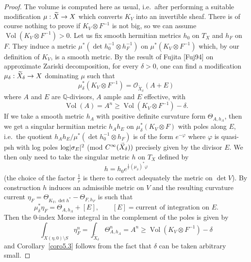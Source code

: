\documentclass[10pt,a4paper]{article}
\DeclareMathOperator{\Vol}{Vol}
\DeclarePairedDelimiter{\abs}{\lvert}{\rvert}
\newcommand*\cO{\mathcal{O}}
\newcommand*\bQ{\mathbb{Q}}
\let\geq\geqslant
\numberwithin{equation}{section}
\begin{document}
\begin{proof}
The volume is computed here as usual, i.e.\ after performing a suitable modifi\-cation $\mu:\smash{\widetilde X}\to X$ which converts $K_V$ into an invertible sheaf. There is of course nothing to prove if
$K_V\otimes F^{-1}$ is not big, so we can assume $\Vol(K_V\otimes F^{-1})>0$. Let us fix smooth hermitian metrics $h_0$ on $T_X$ and
$h_F$ on $F$. They induce a metric $\mu^*(\det h_0^{-1}\otimes h_F^{-1})$ on $\mu^*(K_V\otimes F^{-1})$ which, by our definition of $K_V$, is a smooth metric. By the result of Fujita [Fuj94] on approximate Zariski decomposition, for every $\delta>0$, one can find a modification $\mu_\delta:\smash{\widetilde X_\delta}\to X$ dominating
$\mu$ such that
\[
\mu_\delta^*\left(K_V\otimes F^{-1}\right) =\cO_{\widetilde X_\delta}(A+E)
\]
where $A$ and $E$ are $\bQ$-divisors, $A$ ample and $E$ effective, with
\[
\Vol(A)=A^n\geq \Vol\left(K_V\otimes F^{-1}\right)-\delta.
\]
If we take a smooth metric $h_A$ with positive definite curvature form
$\Theta_{A,h_A}$, then we get a singular hermitian metric $h_Ah_E$ on
$\mu_\delta^*(K_V\otimes F)$ with poles along $E$, i.e.\ the quotient
$h_Ah_E/\mu^*(\det h_0^{-1}\otimes h_F)$ is of the form $e^{-\varphi}$ where
$\varphi$ is quasi-psh with log poles $\log\abs{\sigma_E}^2$ (mod $C^\infty(\smash{\widetilde X_\delta}))$ precisely given by the divisor $E$. We then only need to take the singular metric $h$ on $T_X$ defined by
\[
h=h_0e^{\tfrac{1}{ r}(\mu_\delta)^*\varphi}
\]
(the choice of the factor $\tfrac{1}{ r}$ is there to correct adequately the metric on $\det V$). By construction $h$ induces an admissible metric on $V$ and the resulting curvature current $\eta_F=\Theta_{K_V,\det h^*}-\Theta_{F,h_F}$ is such that
\[
\mu_\delta^*\eta_F = \Theta_{A,h_A} +[E],\qquad
\text{$[E]={}$current of integration on $E$.}
\]
Then the $0$-index Morse integral in the complement of the poles is given by
\[
\int_{X(\eta,0)\setminus S}\eta_F^n=\int_{\widetilde X_\delta}\Theta_{A,h_A}^n=A^n\ge
\Vol\left(K_V\otimes F^{-1}\right)-\delta
\]
and Corollary~\ref{coro5.3} follows from the fact that $\delta$ can be taken arbitrary small.
\end{proof}
\end{document}
